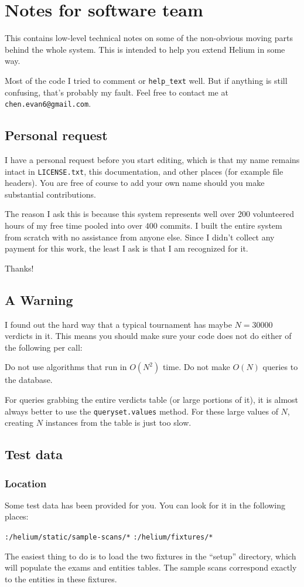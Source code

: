 \chapter{Notes for software team}
This contains low-level technical notes on some of the non-obvious
moving parts behind the whole system.
This is intended to help you extend Helium in some way.

Most of the code I tried to comment or \verb+help_text+ well.
But if anything is still confusing, that's probably my fault.
Feel free to contact me at \texttt{chen.evan6@gmail.com}.

\section{Personal request}
I have a personal request before you start editing,
which is that my name remains intact in \texttt{LICENSE.txt},
this documentation, and other places (for example file headers).
You are free of course to add your own name
should you make substantial contributions.

The reason I ask this is because this system represents
well over $200$ volunteered hours of my free time
pooled into over $400$ commits.
I built the entire system from scratch with no assistance from anyone else.
Since I didn't collect any payment for this work,
the least I ask is that I am recognized for it.

Thanks!

\section{A Warning}
I found out the hard way that a typical tournament has maybe $N = 30000$ verdicts in it.
This means you should make sure your code does not do either of the following per call:
\begin{itemize}
	\ii Do not use algorithms that run in $O(N^2)$ time.
	\ii Do not make $O(N)$ queries to the database.
\end{itemize}
For queries grabbing the entire verdicts table (or large portions of it),
it is almost always better to use the \texttt{queryset.values} method.
For these large values of $N$, creating $N$ instances from the table is just too slow.

\section{Test data}
\subsection{Location}
Some test data has been provided for you.
You can look for it in the following places:
\begin{itemize}
	\ii \verb+:/helium/static/sample-scans/*+
	\ii \verb+:/helium/fixtures/*+
\end{itemize}
The easiest thing to do is to load the two fixtures in the ``setup'' directory,
which will populate the exams and entities tables.
The sample scans correspond exactly to the entities in these fixtures.

